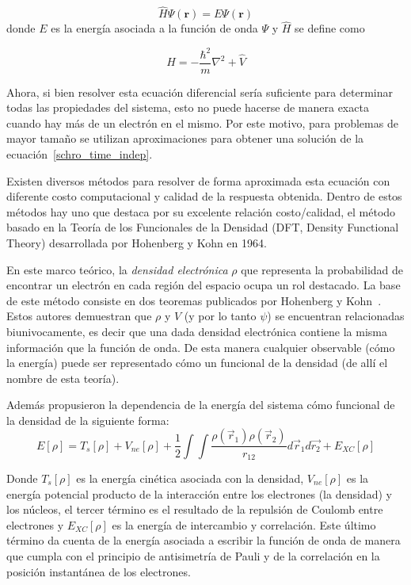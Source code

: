 \begin{equation}
    \label{schro_time_indep}
    \hat{H} \Psi(\mathbf{r}) = E \Psi(\mathbf{r})
\end{equation}
donde $E$ es la energ\'ia asociada a la funci\'on de onda $\Psi$ y $\hat{H}$ se define como

\begin{equation*}
    \hat{H} =  -\frac{\hbar^2}{m} \nabla^2 + \hat{V}
\end{equation*}


Ahora, si bien resolver esta ecuaci\'on diferencial ser\'ia suficiente para determinar todas las propiedades del sistema, esto no puede hacerse de
manera exacta cuando hay m\'as de un electr\'on en el mismo. Por este motivo, para problemas de mayor tama\~no se utilizan aproximaciones
para obtener una soluci\'on de la ecuaci\'on~\ref{schro_time_indep}.

Existen diversos m\'etodos para resolver de forma aproximada esta ecuaci\'on con diferente costo computacional y calidad de la respuesta obtenida.
Dentro de estos m\'etodos hay uno que destaca por su excelente relaci\'on costo/calidad, el m\'etodo basado en la Teor\'ia de los Funcionales de la Densidad (DFT, Density Functional Theory) desarrollada por Hohenberg y Kohn en 1964.

En este marco te\'orico, la \textit{densidad electr\'onica} $\rho$ que representa la probabilidad de encontrar un electr\'on en cada regi\'on del espacio ocupa un rol destacado.
La base de este m\'etodo consiste en dos teoremas publicados por Hohenberg y Kohn~\cite{HohenbergKohn}.
Estos autores demuestran que $\rho$ y $V$ (y por lo tanto $\psi$) se encuentran relacionadas biunivocamente,
es decir que una dada densidad electr\'onica contiene la misma informaci\'on que la funci\'on de onda.
De esta manera cualquier observable (c\'omo la energ\'ia) puede ser representado c\'omo un funcional de la densidad (de all\'i el nombre de esta teor\'ia).

Adem\'as propusieron la dependencia de la energ\'ia del sistema c\'omo funcional de la densidad de la siguiente forma:
\begin{equation}
    \label{hohenberg_kohn_energy}
    E[\rho] = T_s[\rho] + V_{ne}[\rho] + \frac{1}{2} \int \int \frac{\rho(\vec{r}_1) \rho(\vec{r}_2)}{r_{12}} d\vec{r}_1 d\vec{r_2} + E_{XC}[\rho]
\end{equation}

Donde $T_s[\rho]$ es la energ\'ia cin\'etica asociada con la densidad, $V_{ne}[\rho]$ es la energ\'ia potencial producto de la interacci\'on entre los electrones (la densidad) y los n\'ucleos, el tercer t\'ermino es el resultado de la repulsi\'on de Coulomb entre electrones y $E_{XC}[\rho]$ es la energ\'ia de intercambio y correlaci\'on. 
Este \'ultimo t\'ermino da cuenta de la energ\'ia asociada a escribir la funci\'on de onda de manera que cumpla con el principio de antisimetr\'ia de Pauli y de la correlaci\'on en la posici\'on instant\'anea de los electrones.

